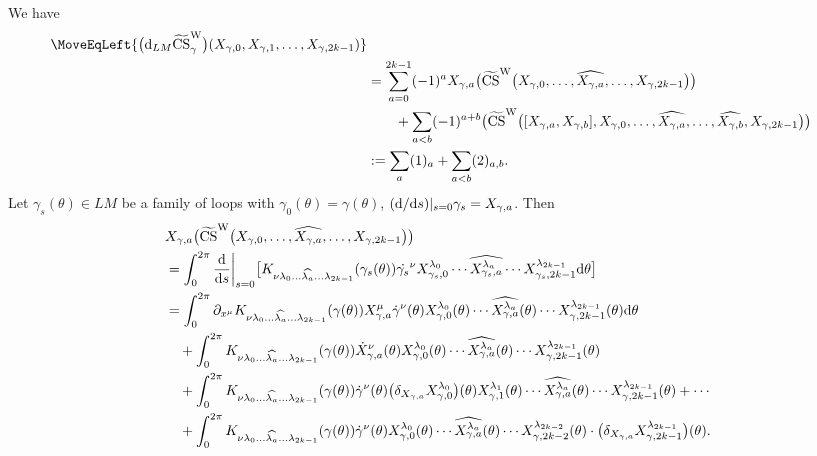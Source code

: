 \documentclass[10pt,a4paper]{amsart}
\numberwithin{equation}{section}
\theoremstyle{definition}
\newcommand{\bm}{ M}
\newcommand{\ocs}{\widetilde{{\rm CS}}}
\begin{document}
We have
\begin{align*}
 \MoveEqLeft{\bigl({\rm d}_{L\bm} \ocs^{\rm W}_\gamma \bigr)
 (X_{\gamma ,0}, X_{\gamma ,1},\dots, X_{\gamma ,2k-1} ) }\nonumber\\
 &=
 \sum_{a=0}^{2k-1}
 (-1)^a X_{\gamma ,a}
 \bigl(\ocs^{\rm W} \bigl(X_{\gamma ,0},\dots,
 \widehat{X_{\gamma ,a}},
 \dots, X_{\gamma ,2k-1}\bigr)\bigr) \\
&\qquad +
\sum_{a<b} (-1)^{a+b}
 \bigl(\ocs^{\rm W} \bigl( [X_{\gamma , a}, X_{\gamma , b}],
 X_{\gamma ,0},\dots, \widehat{X_{\gamma ,a}},
 \dots, \widehat{X_{\gamma , b}}, X_{\gamma ,2k-1}\bigr)\bigr) \nonumber \\
 &:= \sum_a (1)_a + \sum_{a<b}(2)_{a,b}\nonumber.
 \end{align*}
Let
$\gamma_s (\theta) \in L{\bm} $ be a family of loops with
$\gamma_0 (\theta ) = \gamma (\theta)$,
$({\rm d}/{\rm d}s)|_{s=0} \gamma_s = X_{\gamma , a} $.
Then
\begin{align}\label{eq:4}
& X_{\gamma ,a}
 \bigl(\ocs^{\rm W} \bigl(X_{\gamma ,0},\dots, \widehat{X_{\gamma ,a}},
 \dots, X_{\gamma ,2k-1}\bigr)\bigr) \nonumber \\
 &=
\int_{0}^{2\pi}
 {\frac{{\rm d}}{{\rm d}s}}\biggl|_{s=0}
\bigl[K_{\nu \lambda_0 \dots \widehat{\lambda_a}\dots \lambda_{2k-1}}
(\gamma_s (\theta )) {\dot{\gamma_s}^\nu}
X_{\gamma_s,0}^{\lambda_0}
\cdots \widehat{X_{\gamma_s ,a}^{\lambda_a}}\cdots
X_{\gamma_s,2k-1}^{\lambda_{2k-1}}
 {\rm d}\theta \bigr] \nonumber\\
&=
\int_{0}^{2\pi}
 \partial_{x^\mu} K_{\nu \lambda_0 \dots \widehat{\lambda_a}\dots\lambda_{2k-1}}
(\gamma(\theta))
X_{\gamma, a}^{\mu} \dot{\gamma}^\nu (\theta)
X_{\gamma ,0}^{\lambda_0 } (\theta)
\cdots \widehat{X_{\gamma ,a}^{\lambda_a}}(\theta)\cdots
X_{\gamma ,2k-1}^{\lambda_{2k-1} } (\theta)
 {\rm d}\theta \nonumber\\
&\quad{} +
\int_{0}^{2\pi}
K_{\nu \lambda_0 \dots \widehat{\lambda_a}\dots \lambda_{2k-1}} (\gamma (\theta) )
\dot{X}_{\gamma ,a}^\nu (\theta )
X_{\gamma ,0}^{\lambda_0 } (\theta)
\cdots\widehat{X_{\gamma ,a}^{\lambda_a}}(\theta)\cdots
X_{\gamma ,2k-1}^{\lambda_{2k-1} } (\theta) \\
&\quad{} +
\int_{0}^{2\pi}
K_{\nu \lambda_0 \dots\widehat{\lambda_a}\dots \lambda_{2k-1}} (\gamma (\theta) )
\dot{\gamma}^\nu (\theta)
\bigl(\delta_{X_{\gamma, a}}X_{\gamma, 0}^{\lambda_0}\bigr)(\theta)
X_{\gamma ,1}^{\lambda_1 } (\theta)
\cdots\widehat{X_{\gamma ,a}^{\lambda_a}}(\theta) \cdots X_{\gamma ,2k-1}^{\lambda_{2k-1} } (\theta) + \cdots\nonumber \\
&\quad{} +
\int_{0}^{2\pi}
K_{\nu \lambda_0 \dots\widehat{\lambda_a}\dots \lambda_{2k-1}} (\gamma (\theta) )
\dot{\gamma}^\nu (\theta)
X_{\gamma ,0}^{\lambda_0 } (\theta)
\cdots\widehat{X_{\gamma ,a}^{\lambda_a}}(\theta)\cdots
X_{\gamma,2k-2}^{\lambda_{2k-2} } (\theta) \nonumber
 \cdot
 \bigl(\delta_{X_{\gamma, a}}X_{\gamma, 2k-1}^{\lambda_{2k-1}} \bigr)(\theta).\nonumber
\end{align}
\end{document}
